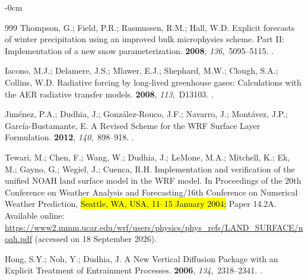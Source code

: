 \documentclass[air,article,accept,moreauthors]{Definitions/mdpi}
\begin{document}
\begin{adjustwidth}{-\extralength}{0cm}
\begin{thebibliography}{999}
Thompson, G.; Field, P.R.; Rasmussen, R.M.; Hall, W.D.
\newblock Explicit forecasts of winter precipitation using an improved bulk microphysics scheme. Part {II}: Implementation of a new snow parameterization.
 {\bf 2008}, {\em 136},~5095--5115.
.

Iacono, M.J.; Delamere, J.S.; Mlawer, E.J.; Shephard, M.W.; Clough, S.A.; Collins, W.D.
\newblock Radiative forcing by long-lived greenhouse gases: Calculations with the {AER} radiative transfer models.
 {\bf 2008}, {\em 113},~D13103.
.

Jim{\'e}nez, P.A.; Dudhia, J.; Gonz{\'a}lez-Rouco, J.F.; Navarro, J.; Mont{\'a}vez, J.P.; Garc{\'i}a-Bustamante, E.
\newblock A Revised Scheme for the {WRF} Surface Layer Formulation.
 {\bf 2012}, {\em 140},~898--918.
.

Tewari, M.; Chen, F.; Wang, W.; Dudhia, J.; LeMone, M.A.; Mitchell, K.; Ek, M.; Gayno, G.; Wegiel, J.; Cuenca, R.H.
\newblock Implementation and verification of the unified {NOAH} land surface model in the {WRF} model.
\newblock In Proceedings of the 20th Conference on Weather Analysis and Forecasting/16th Conference on Numerical Weather Prediction, \hl{Seattle, WA, USA, 11–15 January 2004;} %
 Paper 14.2A.  Available online: \url{https://www2.mmm.ucar.edu/wrf/users/physics/phys_refs/LAND_SURFACE/noah.pdf} (accessed on 18 September 2026).

Hong, S.Y.; Noh, Y.; Dudhia, J.
\newblock A New Vertical Diffusion Package with an Explicit Treatment of Entrainment Processes.
 {\bf 2006}, {\em 134},~2318--2341.
.


\end{thebibliography}
\end{adjustwidth}
\end{document}
